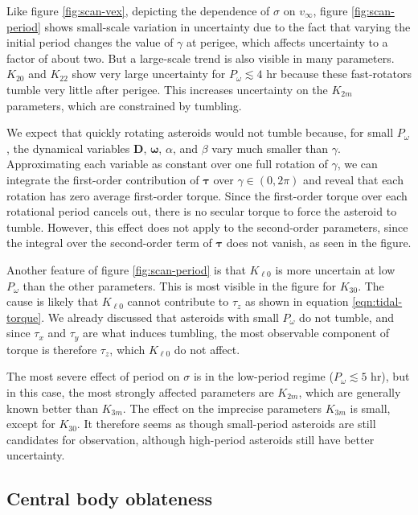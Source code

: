 \documentclass[fleqn,usenatbib]{mnras}
\begin{document}
Like figure \ref{fig:scan-vex}, depicting the dependence of $\sigma$ on $v_\infty$, figure \ref{fig:scan-period} shows small-scale variation in uncertainty due to the fact that varying the initial period changes the value of $\gamma$ at perigee, which affects uncertainty to a factor of about two. But a large-scale trend is also visible in many parameters. $K_{20}$ and $K_{22}$ show very large uncertainty for $P_\omega \lesssim 4$ hr because these fast-rotators tumble very little after perigee. This increases uncertainty on the $K_{2m}$ parameters, which are constrained by tumbling.

We expect that quickly rotating asteroids would not tumble because, for small $P_\omega$, the dynamical variables $\bm D$, $\bm \omega$, $\alpha$, and $\beta$ vary much smaller than $\gamma$. Approximating each variable as constant over one full rotation of $\gamma$, we can integrate the first-order contribution of $\bm \tau$ over $\gamma \in (0, 2\pi)$ and reveal that each rotation has zero average first-order torque. Since the first-order torque over each rotational period cancels out, there is no secular torque to force the asteroid to tumble. However, this effect does not apply to the second-order parameters, since the integral over the second-order term of $\bm \tau$ does not vanish, as seen in the figure.

Another feature of figure \ref{fig:scan-period} is that $K_{\ell 0}$ is more uncertain at low $P_\omega$ than the other parameters. This is most visible in the figure for $K_{30}$. The cause is likely that $K_{\ell 0}$ cannot contribute to $\tau_z$ as shown in equation \ref{eqn:tidal-torque}. We already discussed that asteroids with small $P_\omega$ do not tumble, and since $\tau_x$ and $\tau_y$ are what induces tumbling, the most observable component of torque is therefore $\tau_z$, which $K_{\ell 0}$ do not affect.

The most severe effect of period on $\sigma$ is in the low-period regime ($P_\omega \lesssim 5$ hr), but in this case, the most strongly affected parameters are $K_{2m}$, which are generally known better than $K_{3m}$. The effect on the imprecise parameters $K_{3m}$ is small, except for $K_{30}$. It therefore seems as though small-period asteroids are still candidates for observation, although high-period asteroids still have better uncertainty.


\subsection{Central body oblateness}
\label{sec:scan-oblateness}
\end{document}
